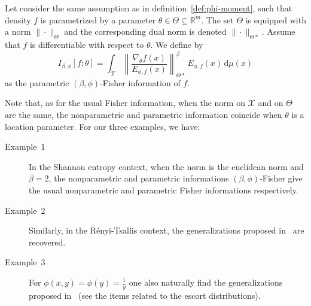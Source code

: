 \documentclass[entropy,article,submit,moreauthors,pdftex]{Definitions/mdpi}
\newcommand{\SZ}[1]{{\color{blue} #1}}
\def\dmu{\mathrm{d}\mu}
\def\Rset{\mathbb{R}}
\def\X{\mathcal{X}}
\begin{document}
\begin{Definition}
\label{def:p-phi-Fisher}
%
  Let consider  the same assumption as  in definition~\ref{def:phi-moment}, such
  that density $f$  is parametrized by a parameter $\theta  \in \Theta \subseteq
  \Rset^m$.  The set $\Theta$ is equipped with a norm $\| \cdot \|_{\Theta}$ and
  the corresponding dual  norm is denoted $\| \cdot  \|_{\Theta*}$.  Assume that
  $f$ is differentiable with respect to $\theta$. We define by
  \begin{equation}\label{eq:p-phi-Fisher}
  I_{\beta,\phi}[f;\theta] = \int_\X \left\| \frac{\nabla_\theta
  f(x)}{E_{\phi,f}(x)} \right\|_{\Theta*}^\beta \, E_{\phi,f}(x) \, \dmu(x)
  \end{equation}
  as the parametric $(\beta,\phi)$-Fisher information of $f$.
\end{Definition}
%
Note that,  as for the usual  Fisher information, when  the norm on $\X$  and on
$\Theta$ are  the same,  the nonparametric  and parametric  information coincide
when $\theta$ is a location parameter. For our three examples, we have:
%
\begin{description}
\item[Example~1] In the Shannon entropy context,  when the norm is the euclidean
  norm  and  $\beta   =  2$,  the  nonparametric   and  parametric  informations
  $(\beta,\phi)$-Fisher  give  the  usual nonparametric  and  parametric  Fisher
  informations respectively.
%
\item[Example~2] Similarly, in the  R\'enyi-Tsallis context, the generalizations
  proposed in~\cite{Ber12:06_1, Ber12:06_2, Ber13} are recovered.
%
\item[Example~3] For $\phi(x,y) = \phi(y)  = \frac{1}{y}$ \SZ{one also naturally
  find  the generalizations  proposed  in~\cite{Ber12:06_1, Ber12:06_2,  Ber13}}
  (see the items related to the escort distributions).
\end{description}



\
\end{document}
